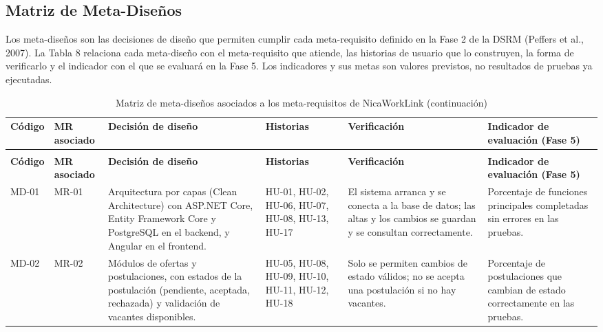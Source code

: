 \clearpage

\subsection{Matriz de Meta-Diseños}

Los meta-diseños son las decisiones de diseño que permiten cumplir cada meta-requisito definido en la Fase 2 de la DSRM (Peffers et al., 2007). La Tabla 8 relaciona cada meta-diseño con el meta-requisito que atiende, las historias de usuario que lo construyen, la forma de verificarlo y el indicador con el que se evaluará en la Fase 5. Los indicadores y sus metas son valores previstos, no resultados de pruebas ya ejecutadas.

\begin{longtable}{@{}>{\raggedright\arraybackslash}p{1.8cm}>{\raggedright\arraybackslash}p{1.8cm}>{\raggedright\arraybackslash}p{4.2cm}>{\raggedright\arraybackslash}p{2.2cm}>{\raggedright\arraybackslash}p{3.0cm}>{\raggedright\arraybackslash}p{3.0cm}@{}}
	\caption{Matriz de meta-diseños asociados a los meta-requisitos de NicaWorkLink}\label{tab:matriz-metadisenos}\\
	\hline
	\textbf{Código} & \textbf{MR asociado} & \textbf{Decisión de diseño} & \textbf{Historias} & \textbf{Verificación} & \textbf{Indicador de evaluación (Fase 5)} \\
	\hline
	\endfirsthead
	\caption[]{Matriz de meta-diseños asociados a los meta-requisitos de NicaWorkLink (continuación)}\\
	\hline
	\textbf{Código} & \textbf{MR asociado} & \textbf{Decisión de diseño} & \textbf{Historias} & \textbf{Verificación} & \textbf{Indicador de evaluación (Fase 5)} \\
	\hline
	\endhead
	\hline
	\endlastfoot
	MD-01 & MR-01 & Arquitectura por capas (Clean Architecture) con ASP.NET Core, Entity Framework Core y PostgreSQL en el backend, y Angular en el frontend. & HU-01, HU-02, HU-06, HU-07, HU-08, HU-13, HU-17 & El sistema arranca y se conecta a la base de datos; las altas y los cambios se guardan y se consultan correctamente. & Porcentaje de funciones principales completadas sin errores en las pruebas. \\
	\hline
	MD-02 & MR-02 & Módulos de ofertas y postulaciones, con estados de la postulación (pendiente, aceptada, rechazada) y validación de vacantes disponibles. & HU-05, HU-08, HU-09, HU-10, HU-11, HU-12, HU-18 & Solo se permiten cambios de estado válidos; no se acepta una postulación si no hay vacantes. & Porcentaje de postulaciones que cambian de estado correctamente en las pruebas. \\

\end{longtable}

